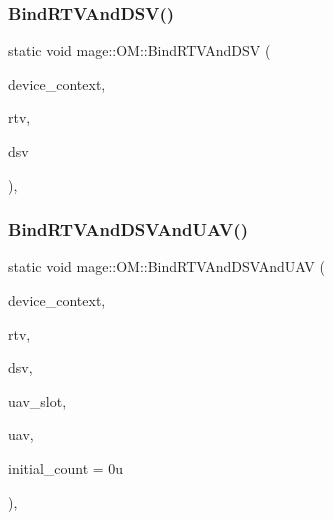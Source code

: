 \subsubsection{\texorpdfstring{Bind\+R\+T\+V\+And\+D\+S\+V()}{BindRTVAndDSV()}}
{\footnotesize\ttfamily static void mage\+::\+O\+M\+::\+Bind\+R\+T\+V\+And\+D\+SV (\begin{DoxyParamCaption}\item[{I\+D3\+D11\+Device\+Context2 $\ast$}]{device\+\_\+context,  }\item[{I\+D3\+D11\+Render\+Target\+View $\ast$}]{rtv,  }\item[{I\+D3\+D11\+Depth\+Stencil\+View $\ast$}]{dsv }\end{DoxyParamCaption})\hspace{0.3cm}{\ttfamily [static]}, {\ttfamily [noexcept]}}

\hypertarget{structmage_1_1_o_m_af4d9441b3a8d905debeb46e6bdcdcd3f}{}\label{structmage_1_1_o_m_af4d9441b3a8d905debeb46e6bdcdcd3f} 
\subsubsection{\texorpdfstring{Bind\+R\+T\+V\+And\+D\+S\+V\+And\+U\+A\+V()}{BindRTVAndDSVAndUAV()}}
{\footnotesize\ttfamily static void mage\+::\+O\+M\+::\+Bind\+R\+T\+V\+And\+D\+S\+V\+And\+U\+AV (\begin{DoxyParamCaption}\item[{I\+D3\+D11\+Device\+Context2 $\ast$}]{device\+\_\+context,  }\item[{I\+D3\+D11\+Render\+Target\+View $\ast$}]{rtv,  }\item[{I\+D3\+D11\+Depth\+Stencil\+View $\ast$}]{dsv,  }\item[{U\+I\+NT}]{uav\+\_\+slot,  }\item[{I\+D3\+D11\+Unordered\+Access\+View $\ast$}]{uav,  }\item[{U\+I\+NT}]{initial\+\_\+count = {\ttfamily 0u} }\end{DoxyParamCaption})\hspace{0.3cm}{\ttfamily [static]}, {\ttfamily [noexcept]}}

\hypertarget{structmage_1_1_o_m_ab296a9a3c4355437c8ef1008b2938112}{}\label{structmage_1_1_o_m_ab296a9a3c4355437c8ef1008b2938112} 
